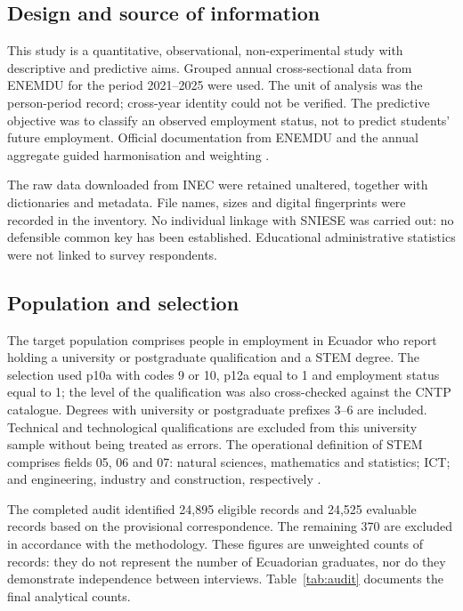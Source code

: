 

\subsection{Design and source of information}



This study is a quantitative, observational, non-experimental study with descriptive and predictive aims. Grouped annual cross-sectional data from ENEMDU for the period 2021--2025 were used. The unit of analysis was the person-period record; cross-year identity could not be verified. The predictive objective was to classify an observed employment status, not to predict students' future employment. Official documentation from ENEMDU and the annual aggregate guided harmonisation and weighting \cite{Censos2025,InstitutoNacionaldeEstadsticayCensos2026}.

The raw data downloaded from INEC were retained unaltered, together with dictionaries and metadata. File names, sizes and digital fingerprints were recorded in the inventory. No individual linkage with SNIESE was carried out: no defensible common key has been established. Educational administrative statistics were not linked to survey respondents.

\subsection{Population and selection}



The target population comprises people in employment in Ecuador who report holding a university or postgraduate qualification and a STEM degree. The selection used p10a with codes 9 or 10, p12a equal to 1 and employment status equal to 1; the level of the qualification was also cross-checked against the CNTP catalogue. Degrees with university or postgraduate prefixes 3--6 are included. Technical and technological qualifications are excluded from this university sample without being treated as errors. The operational definition of STEM comprises fields 05, 06 and 07: natural sciences, mathematics and statistics; ICT; and engineering, industry and construction, respectively \cite{Statistics2014}.


The completed audit identified 24,895 eligible records and 24,525 evaluable records based on the provisional correspondence. The remaining 370 are excluded in accordance with the methodology. These figures are unweighted counts of records: they do not represent the number of Ecuadorian graduates, nor do they demonstrate independence between interviews. Table~\ref{tab:audit} documents the final analytical counts.


